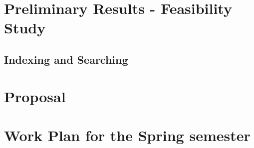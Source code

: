 \documentclass{layout/si-msc-proposal}
\begin{document}

    \section{Preliminary Results - Feasibility Study}\label{sec:preliminary-results---feasibility-study}

    \subsection{Indexing and Searching}\label{subsec:indexing-and-searching}
    


    \section{Proposal}\label{sec:proposal}


    \section{Work Plan for the Spring semester}\label{sec:work-plan-for-the-spring-semester}
    


    \newpage
    \nocite{*}
    
\end{document}
